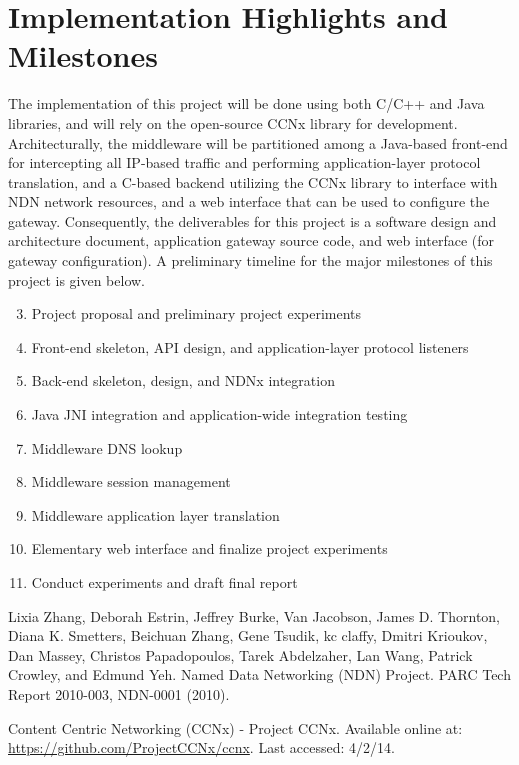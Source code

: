 \documentclass[10pt]{article}
\begin{document}
\section{Implementation Highlights and Milestones}
The implementation of this project will be done using both C/C++ and Java libraries, and will rely on the open-source CCNx \cite{ccnx} library for development. Architecturally, the middleware will be partitioned among a Java-based front-end for intercepting all IP-based traffic and performing application-layer protocol translation, and a C-based backend utilizing the CCNx library to interface with NDN network resources, and a web interface that can be used to configure the gateway. Consequently, the deliverables for this project is a software design and architecture document, application gateway source code, and web interface (for gateway configuration). A preliminary timeline for the major milestones of this project is given below.

\begin{enumerate}[{\bf Week} 1:]
	\setcounter{enumi}{2}
	\item Project proposal and preliminary project experiments
	\item Front-end skeleton, API design, and application-layer protocol listeners
	\item Back-end skeleton, design, and NDNx integration
	\item Java JNI integration and application-wide integration testing
	\item Middleware DNS lookup
	\item Middleware session management
	\item Middleware application layer translation
	\item Elementary web interface and finalize project experiments
	\item Conduct experiments and draft final report 
\end{enumerate}


\begin{thebibliography}{[MT1]}

 Lixia Zhang, Deborah Estrin, Jeffrey Burke, Van Jacobson, James D. Thornton, Diana K. Smetters, Beichuan Zhang, Gene Tsudik, kc claffy, Dmitri Krioukov, Dan Massey, Christos Papadopoulos, Tarek Abdelzaher, Lan Wang, Patrick Crowley, and Edmund Yeh. Named Data Networking (NDN) Project. PARC Tech Report 2010-003, NDN-0001 (2010).

 Content Centric Networking (CCNx) - Project CCNx. Available online at: \url{https://github.com/ProjectCCNx/ccnx}. Last accessed: 4/2/14.

\end{thebibliography}
\end{document}
